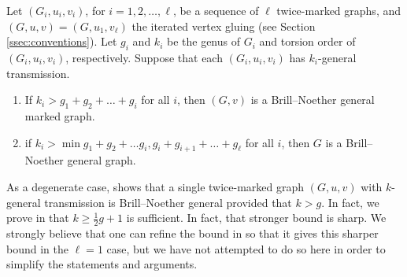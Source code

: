 \begin{theorem}
\label{thm:bngChain}
Let $(G_i, u_i, v_i)$, for $i=1,2, \ldots, \ell$, be a sequence of $\ell$ twice-marked graphs, and $(G,u,v) = (G,u_1, v_\ell)$ the iterated vertex gluing (see Section \ref{ssec:conventions}). Let $g_i$ and $k_i$ be the genus of $G_i$ and torsion order of $(G_i,u_i,v_i)$, respectively.  Suppose that each $(G_i, u_i,v_i)$ has $k_i$-general transmission.
\begin{enumerate}[label = \arabic*)]
    \item If $k_i > g_1 + g_2 + \ldots + g_i$ for all $i$, then $(G,v)$ is a Brill--Noether general marked graph.
    \item if $k_i > \min{g_1 + g_2 + \ldots g_i, g_i + g_{i+1} + \ldots + g_\ell }$ for all $i$, then $G$ is a Brill--Noether general graph.
\end{enumerate}
\end{theorem}

\begin{rema}
As a degenerate case,  shows that a single twice-marked graph $(G,u,v)$ with $k$-general transmission is Brill--Noether general provided that $k > g$. In fact, we prove in  that $k \geq \frac12 g + 1$ is sufficient. In fact, that stronger bound is sharp. We strongly believe that one can refine the bound in  so that it gives this sharper bound in the $\ell = 1$ case, but we have not attempted to do so here in order to simplify the statements and arguments.
\end{rema}

